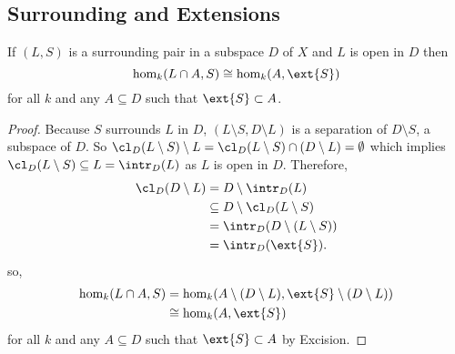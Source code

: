
\subsection{Surrounding and Extensions}

\begin{lemma}\label{lem:excision}
  If $(L, S)$ is a surrounding pair in a subspace $D$ of $X$ and $L$ is open in $D$ then
  \[ \hom_k(L\cap A, S) \cong \hom_k(A, \ext{S}) \]
  for all $k$ and any $A\subseteq D$ such that $\ext{S}\subset A$.
\end{lemma}
\begin{proof}
  Because $S$ surrounds $L$ in $D$, $(L\setminus S, D\setminus L)$ is a separation of $D\setminus S$, a subspace of $D$.
  So $\cl_D(L\setminus S)\setminus L = \cl_D(L\setminus S) \cap (D\setminus L) = \emptyset$ which implies $\cl_D(L\setminus S)\subseteq L = \intr_D(L)$ as $L$ is open in $D$.
  Therefore,
  \begin{align*}
    \cl_D(D\setminus L) &= D\setminus \intr_D(L)\\
                        &\subseteq D\setminus \cl_D(L\setminus S)\\
                        &= \intr_D(D\setminus (L\setminus S))\\
                        &= \intr_D(\ext{S}).
  \end{align*}
  so,
  \begin{align*}
    \hom_k(L\cap A, S) &= \hom_k(A\setminus (D\setminus L), \ext{S}\setminus (D\setminus L))\\
      &\cong \hom_k(A, \ext{S})
  \end{align*}
  for all $k$ and any $A\subseteq D$ such that $\ext{S}\subset A$ by Excision.
\end{proof}

%

